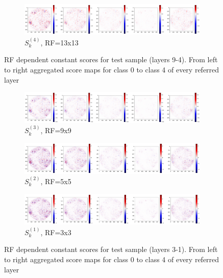 \documentclass[preprint]{elsarticle}
\theoremstyle{definition} %
\theoremstyle{remark}
\begin{document}
\begin{figure}[h!]
	\begin{subfigure}[b]{\textwidth}
		\includegraphics[width=\textwidth]{figures/score-prop-23713_left/score_k13.png}
		\caption{$S_k^{(4)}$, RF=13x13}
		\label{fig:score_k13}
	\end{subfigure}
	
	\caption{RF dependent constant scores for test sample (layers 9-4). From left to right aggregated score maps for class 0 to class 4 of every referred layer}
	\label{fig:test1_score_explanation2_k}
\end{figure}

\begin{figure}[h!]
	\centering
	\begin{subfigure}[b]{\textwidth}
		\includegraphics[width=\textwidth]{figures/score-prop-23713_left/score_k9.png}
		\caption{$S_k^{(3)}$, RF=9x9}
		\label{fig:score_k9}
	\end{subfigure}

	\begin{subfigure}[b]{\textwidth}
		\includegraphics[width=\textwidth]{figures/score-prop-23713_left/score_k5.png}
		\caption{$S_k^{(2)}$, RF=5x5}
		\label{fig:score_k5}
	\end{subfigure}
		
	\begin{subfigure}[b]{\textwidth}
	\includegraphics[width=\textwidth]{figures/score-prop-23713_left/score_k3.png}
	\caption{$S_k^{(1)}$, RF=3x3}
	\label{fig:score_k3}
\end{subfigure}

\caption{RF dependent constant scores for test sample (layers 3-1). From left to right aggregated score maps for class 0 to class 4 of every referred layer}
\label{fig:test1_score_explanation3_k}
\end{figure}
\end{document}
